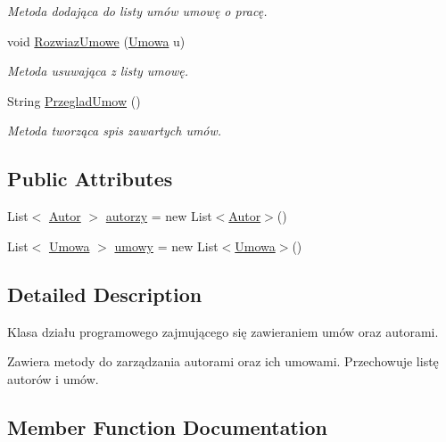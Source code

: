 \begin{DoxyCompactItemize}
\begin{DoxyCompactList}\small\item\em Metoda dodająca do listy umów umowę o pracę. \end{DoxyCompactList}\item 
void \mbox{\hyperlink{class_projekt1_1_1_dzial_programowy_a3852b732a1b07ffc107ac6dc90fb5d64}{Rozwiaz\+Umowe}} (\mbox{\hyperlink{class_projekt1_1_1_umowa}{Umowa}} u)
\begin{DoxyCompactList}\small\item\em Metoda usuwająca z listy umowę. \end{DoxyCompactList}\item 
String \mbox{\hyperlink{class_projekt1_1_1_dzial_programowy_ace0526308526f95c29cc53060ea08b4a}{Przeglad\+Umow}} ()
\begin{DoxyCompactList}\small\item\em Metoda tworząca spis zawartych umów. \end{DoxyCompactList}\end{DoxyCompactItemize}
\subsection*{Public Attributes}
\begin{DoxyCompactItemize}
\item 
List$<$ \mbox{\hyperlink{class_projekt1_1_1_autor}{Autor}} $>$ \mbox{\hyperlink{class_projekt1_1_1_dzial_programowy_aa115c071c0608e10798a1ca503bc8181}{autorzy}} = new List$<$\mbox{\hyperlink{class_projekt1_1_1_autor}{Autor}}$>$()
\item 
List$<$ \mbox{\hyperlink{class_projekt1_1_1_umowa}{Umowa}} $>$ \mbox{\hyperlink{class_projekt1_1_1_dzial_programowy_a0971983aaa0d5e26960a30ee22974301}{umowy}} = new List$<$\mbox{\hyperlink{class_projekt1_1_1_umowa}{Umowa}}$>$()
\end{DoxyCompactItemize}


\subsection{Detailed Description}
Klasa działu programowego zajmującego się zawieraniem umów oraz autorami. 

Zawiera metody do zarządzania autorami oraz ich umowami. Przechowuje listę autorów i umów. 

\subsection{Member Function Documentation}
\mbox{\label{class_projekt1_1_1_dzial_programowy_ae3036a341f8a8ecc9c4069cc3604a8d3}} 
